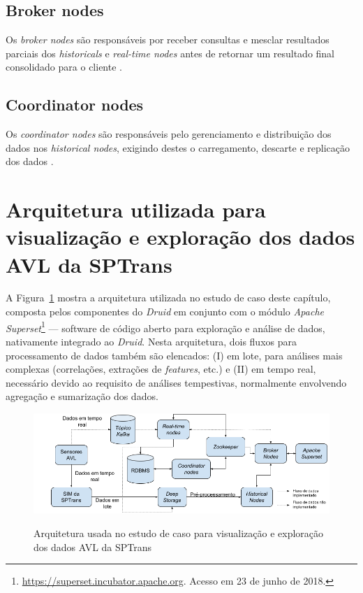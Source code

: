 \documentclass[
	12pt,				%
	oneside,			%
	a4paper,			%
	english,			%
	brazil				%
	]{abntex2ppgsi}
\begin{document}
{{{\subsection{Broker nodes}

Os \textit{broker nodes} são responsáveis por receber consultas e mesclar resultados parciais dos \textit{historicals} e \textit{real-time nodes} antes de retornar um resultado final consolidado para o cliente \cite{yang2014druid}.

\subsection{Coordinator nodes}

Os \textit{coordinator nodes} são responsáveis pelo gerenciamento e distribuição dos dados nos \textit {historical nodes}, exigindo destes o carregamento, descarte e replicação dos dados \cite{yang2014druid}.

\section{Arquitetura utilizada para visualização e exploração dos dados AVL da SPTrans}
\label{arch_viz}

A Figura~\ref{fig:viz_arch} mostra a arquitetura utilizada no estudo de caso deste capítulo, composta pelos componentes do \textit{Druid} em conjunto com o módulo \textit {Apache Superset}\footnote{\url{https://superset.incubator.apache.org}. Acesso em 23 de junho de 2018.} --- software de código aberto para exploração e análise de dados, nativamente integrado ao \textit{Druid}. Nesta arquitetura, dois fluxos para processamento de dados também são elencados: (I) em lote, para análises mais complexas (correlações, extrações de \textit{features}, etc.) e (II) em tempo real, necessário devido ao requisito de análises tempestivas, normalmente envolvendo agregação e sumarização dos dados.

\begin{figure}[!htb]%
	\centering
 	  \caption{Arquitetura usada no estudo de caso para visualização e exploração dos dados AVL da SPTrans}
		\includegraphics[width=1\linewidth]{images/viz_arch_pt.png}
	\label{fig:viz_arch}
\end{figure}

}}}
\end{document}
